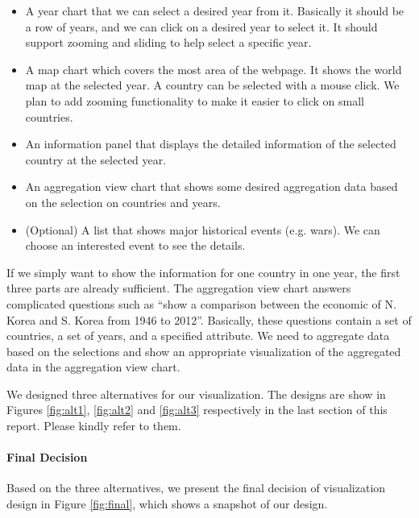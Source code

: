 \documentclass[12pt, fullpage,letterpaper]{article}
\begin{document}
\begin{itemize}
    \item A year chart that we can select a desired year from it.
        Basically it should be a row of years, and we can click on a desired year to select it.
        It should support zooming and sliding to help select a specific year.
    \item A map chart which covers the most area of the webpage.
        It shows the world map at the selected year.
        A country can be selected with a mouse click.
        We plan to add zooming functionality to make it easier to click on small countries.
    \item An information panel that displays the detailed information of the selected country at the selected year.
    \item An aggregation view chart that shows some desired aggregation data based on the selection on countries and years.
    \item (Optional) A list that shows major historical events (e.g. wars). We can choose an interested event to see the details.
\end{itemize}

If we simply want to show the information for one country in one year, the
first three parts are already sufficient. The aggregation view chart answers
complicated questions such
as ``show a comparison between the economic of N. Korea and S. Korea from 1946
to 2012''.  Basically, these questions contain a set of countries, a set of
years, and a specified attribute.  We need to aggregate data based on the
selections and show an appropriate visualization of the aggregated data in the
aggregation view chart.

We designed three alternatives for our visualization.  The designs are show in
Figures \ref{fig:alt1}, \ref{fig:alt2} and \ref{fig:alt3} respectively in the
last section of this report.  Please kindly refer to them.

\paragraph{Final Decision}

Based on the three alternatives, we present the final decision of visualization
design in Figure \ref{fig:final}, which shows a snapshot of our design.
\end{document}
